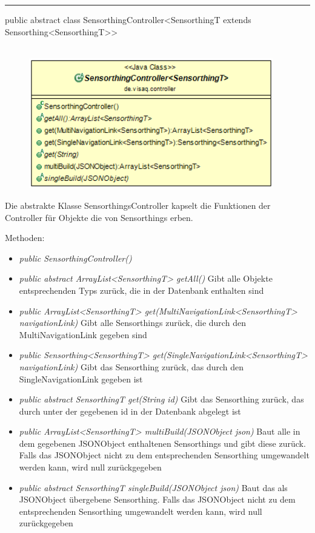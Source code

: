 \rule{\textwidth}{0.4pt}
public abstract class SensorthingController<SensorthingT extends Sensorthing<SensorthingT>>
\\\\
\begin{minipage}{0.5\textwidth}
    \begin{figure}[H]
        {\centering\includegraphics[width=0.95\textwidth]{media/backend/controller/classes/SensorthingsController.png}}
    \end{figure}
    \end{minipage} \hfill
\begin{minipage}{0.5\textwidth}
    Die abstrakte Klasse SensorthingsController kapselt die Funktionen der Controller für Objekte die von Sensorthings erben.
\end{minipage}

Methoden:
\begin{itemize}
    \item \emph{public SensorthingController()}
    \item \emph{public abstract ArrayList<SensorthingT> getAll()}
    Gibt alle Objekte entsprechenden Typs zurück, die in der Datenbank enthalten sind
    \item \emph{public ArrayList<SensorthingT> get(MultiNavigationLink<SensorthingT> navigationLink)}
    Gibt alle Sensorthings zurück, die durch den MultiNavigationLink gegeben sind
    \item \emph{public Sensorthing<SensorthingT> get(SingleNavigationLink<SensorthingT> navigationLink)}
    Gibt das Sensorthing zurück, das durch den SingleNavigationLink gegeben ist
    \item \emph{public abstract SensorthingT get(String id)}
    Gibt das Sensorthing zurück, das durch unter der gegebenen id in der Datenbank abgelegt ist
    \item \emph{public ArrayList<SensorthingT> multiBuild(JSONObject json)}
    Baut alle in dem gegebenen JSONObject enthaltenen Sensorthings und gibt diese zurück.
    Falls das JSONObject nicht zu dem entsprechenden Sensorthing umgewandelt werden kann, wird null zurückgegeben
    \item \emph{public abstract SensorthingT singleBuild(JSONObject json)}
    Baut das als JSONObject übergebene Sensorthing.
    Falls das JSONObject nicht zu dem entsprechenden Sensorthing umgewandelt werden kann, wird null zurückgegeben
\end{itemize}

